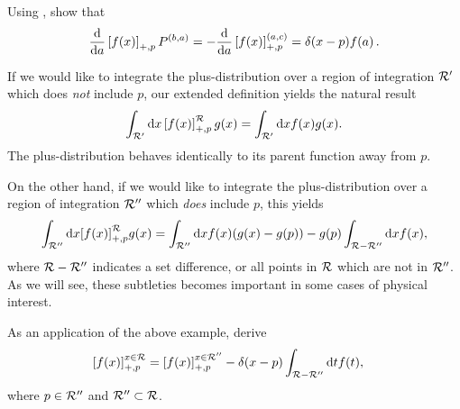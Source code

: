 \begin{subappendices}

\begin{exercise}
    \label{ex:plus-fn-derivative}
    Using , show that
    \begin{align}
        \label{eq:plus-fn-derivative}
        \dv{a} \le[f(x)\ri]_{+,p}P^{(b,a)}
        =
        -
        \dv{a} \le[f(x)\ri]_{+,p}^{(a,c)}
        =
        \delta(x-p) f(a)
        \,.
    \end{align}
\end{exercise}


\begin{example}{}
    If we would like to integrate the plus-distribution over a region of integration \(\mathcal{R}'\) which does \textit{not} include \(p\), our extended definition yields the natural result
    \begin{equation}
        \int_{\mathcal{R}'} \dd x\left[f(x)\right]_{+,p}^{\mathcal{R}} g(x)
        =
        \int_{\mathcal{R}'} \dd x f(x) g(x)
        .
    \end{equation}
    The plus-distribution behaves identically to its parent function away from \(p\).

    On the other hand, if we would like to integrate the plus-distribution over a region of integration \(\mathcal{R}''\) which \textit{does} include \(p\), this yields
    \begin{equation}
        \int_{\mathcal{R}''} \dd x{\left[f(x)\right]}_{+,p}^{\mathcal{R}} g(x)
        =
        \int_{\mathcal{R}''} \dd x f(x) (g(x) - g(p))
        -
        g(p) \int_{\mathcal{R} - \mathcal{R}''} \dd x f(x)
        ,
    \end{equation}
    where \(\mathcal{R} - \mathcal{R}''\) indicates a set difference, or all points in \(\mathcal{R}\) which are not in \(\mathcal{R}''\).
    As we will see, these subtleties becomes important in some cases of physical interest.
\end{example}

\begin{exercise}
    As an application of the above example, derive
    \begin{align}
        \left[f(x)\right]_{+,p}^{x \in \mathcal{R}}
        &=
        \left[f(x)\right]_{+,p}^{x \in \mathcal{R}''}
        -
        \delta(x - p) \int_{\mathcal{R} - \mathcal{R}''} \dd t f(t)
        ,
    \end{align}
    where \(p \in \mathcal{R}''\) and \(\mathcal{R}'' \subset \mathcal{R}\).
\end{exercise}



\end{subappendices}
